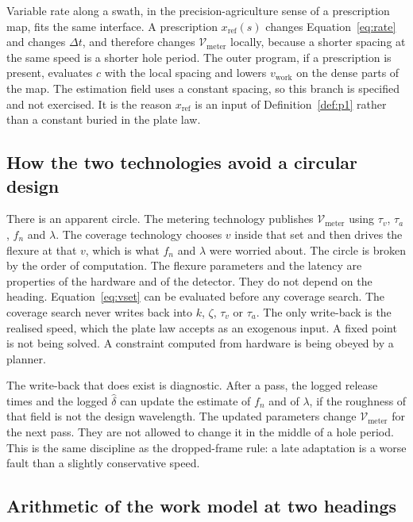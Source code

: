 Variable rate along a swath, in the precision-agriculture sense of a prescription map, fits the same interface. A prescription \(x_{\mathrm{ref}}(s)\) changes Equation~\eqref{eq:rate} and changes \(\Delta t\), and therefore changes \(\mathcal{V}_{\mathrm{meter}}\) locally, because a shorter spacing at the same speed is a shorter hole period. The outer program, if a prescription is present, evaluates \(c\) with the local spacing and lowers \(v_{\mathrm{work}}\) on the dense parts of the map. The estimation field uses a constant spacing, so this branch is specified and not exercised. It is the reason \(x_{\mathrm{ref}}\) is an input of Definition~\ref{def:p1} rather than a constant buried in the plate law.

\subsection{How the two technologies avoid a circular design}

There is an apparent circle. The metering technology publishes \(\mathcal{V}_{\mathrm{meter}}\) using \(\tau_v\), \(\tau_a\), \(f_n\) and \(\lambda\). The coverage technology chooses \(v\) inside that set and then drives the flexure at that \(v\), which is what \(f_n\) and \(\lambda\) were worried about. The circle is broken by the order of computation. The flexure parameters and the latency are properties of the hardware and of the detector. They do not depend on the heading. Equation~\eqref{eq:vset} can be evaluated before any coverage search. The coverage search never writes back into \(k\), \(\zeta\), \(\tau_v\) or \(\tau_a\). The only write-back is the realised speed, which the plate law accepts as an exogenous input. A fixed point is not being solved. A constraint computed from hardware is being obeyed by a planner.

The write-back that does exist is diagnostic. After a pass, the logged release times and the logged \(\hat{\delta}\) can update the estimate of \(f_n\) and of \(\lambda\), if the roughness of that field is not the design wavelength. The updated parameters change \(\mathcal{V}_{\mathrm{meter}}\) for the next pass. They are not allowed to change it in the middle of a hole period. This is the same discipline as the dropped-frame rule: a late adaptation is a worse fault than a slightly conservative speed.

\subsection{Arithmetic of the work model at two headings}

